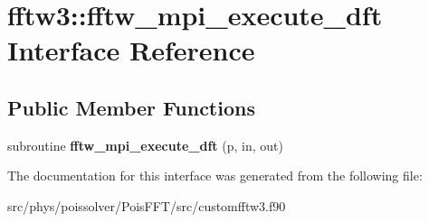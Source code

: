 \hypertarget{interfacefftw3_1_1fftw__mpi__execute__dft}{}\section{fftw3\+:\+:fftw\+\_\+mpi\+\_\+execute\+\_\+dft Interface Reference}
\label{interfacefftw3_1_1fftw__mpi__execute__dft}
\subsection*{Public Member Functions}
\begin{DoxyCompactItemize}
\item 
subroutine {\bfseries fftw\+\_\+mpi\+\_\+execute\+\_\+dft} (p, in, out)\hypertarget{interfacefftw3_1_1fftw__mpi__execute__dft_aa60081179a25b61f39680e2935471582}{}\label{interfacefftw3_1_1fftw__mpi__execute__dft_aa60081179a25b61f39680e2935471582}

\end{DoxyCompactItemize}


The documentation for this interface was generated from the following file\+:\begin{DoxyCompactItemize}
\item 
src/phys/poissolver/\+Pois\+F\+F\+T/src/customfftw3.\+f90\end{DoxyCompactItemize}
